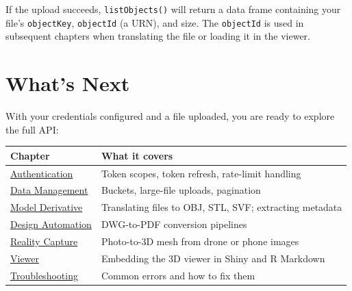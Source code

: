 \documentclass[
  11pt,
  letterpaper,
  DIV=11,
  numbers=noendperiod]{scrreprt}
\newenvironment{Shaded}{\begin{snugshade}}{\end{snugshade}}
\newcommand{\AttributeTok}[1]{\textcolor[rgb]{0.40,0.45,0.13}{#1}}
\newcommand{\CommentTok}[1]{\textcolor[rgb]{0.37,0.37,0.37}{#1}}
\newcommand{\FunctionTok}[1]{\textcolor[rgb]{0.28,0.35,0.67}{#1}}
\newcommand{\NormalTok}[1]{\textcolor[rgb]{0.00,0.23,0.31}{#1}}
\newcommand{\OtherTok}[1]{\textcolor[rgb]{0.00,0.23,0.31}{#1}}
\newcommand{\SpecialCharTok}[1]{\textcolor[rgb]{0.37,0.37,0.37}{#1}}
\begin{document}
\begin{Shaded}
\end{Shaded}

If the upload succeeds, \texttt{listObjects()} will return a data frame
containing your file's \texttt{objectKey}, \texttt{objectId} (a URN),
and size. The \texttt{objectId} is used in subsequent chapters when
translating the file or loading it in the viewer.

\section*{What's Next}\label{whats-next}


With your credentials configured and a file uploaded, you are ready to
explore the full API:

\begin{longtable}[]{@{}
  >{\raggedright\arraybackslash}p{}
  >{\raggedright\arraybackslash}p{}@{}}
\toprule\noalign{}
\begin{minipage}[b]{\linewidth}\raggedright
Chapter
\end{minipage} & \begin{minipage}[b]{\linewidth}\raggedright
What it covers
\end{minipage} \\
\midrule\noalign{}
\endhead
\bottomrule\noalign{}
\endlastfoot
\href{authentication.qmd}{Authentication} & Token scopes, token refresh,
rate-limit handling \\
\href{data-management.qmd}{Data Management} & Buckets, large-file
uploads, pagination \\
\href{model-derivative.qmd}{Model Derivative} & Translating files to
OBJ, STL, SVF; extracting metadata \\
\href{design-automation.qmd}{Design Automation} & DWG-to-PDF conversion
pipelines \\
\href{reality-capture.qmd}{Reality Capture} & Photo-to-3D mesh from
drone or phone images \\
\href{viewer.qmd}{Viewer} & Embedding the 3D viewer in Shiny and R
Markdown \\
\href{troubleshooting.qmd}{Troubleshooting} & Common errors and how to
fix them \\
\end{longtable}
\end{document}
